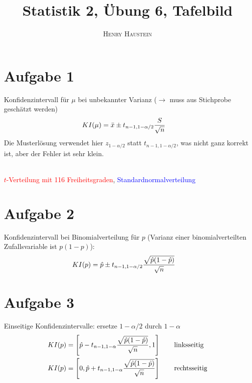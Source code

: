 \documentclass{article}
\title{\textbf{Statistik 2, Übung 6, Tafelbild}}
\author{\textsc{Henry Haustein}}
\date{}
\begin{document}
	\maketitle
	
	\section*{Aufgabe 1}
	Konfidenzintervall für $\mu$ bei unbekannter Varianz ($\to$ muss aus Stichprobe geschätzt werden)
	\begin{align}
		KI(\mu) &= \bar{x} \pm t_{n-1,1-\alpha/2}\frac{S}{\sqrt{n}} \notag
	\end{align}
	Die Musterlösung verwendet hier $z_{1-\alpha/2}$ statt $t_{n-1,1-\alpha/2}$, was nicht ganz korrekt ist, aber der Fehler ist sehr klein.
	\begin{center}
		 \\
		\textcolor{red}{$t$-Verteilung mit 116 Freiheitsgraden}, \textcolor{blue}{Standardnormalverteilung}
	\end{center}

	\section*{Aufgabe 2}
	Konfidenzintervall bei Binomialverteilung für $p$ (Varianz einer binomialverteilten Zufallsvariable ist $p(1-p)$):
	\begin{align}
		KI(p) &= \hat{p} \pm t_{n-1,1-\alpha/2}\frac{\sqrt{\hat{p}(1-\hat{p})}}{\sqrt{n}} \notag
	\end{align}

	\section*{Aufgabe 3}
	Einseitige Konfidenzintervalle: ersetze $1-\alpha/2$ durch $1-\alpha$
	\begin{align}
		KI(p) &= \left[\hat{p} - t_{n-1,1-\alpha}\frac{\sqrt{\hat{p}(1-\hat{p})}}{\sqrt{n}},1\right] \qquad \text{linksseitig} \notag \\
		KI(p) &= \left[0,\hat{p} + t_{n-1,1-\alpha}\frac{\sqrt{\hat{p}(1-\hat{p})}}{\sqrt{n}}\right] \qquad \text{rechtsseitig} \notag
	\end{align}
	
\end{document}
